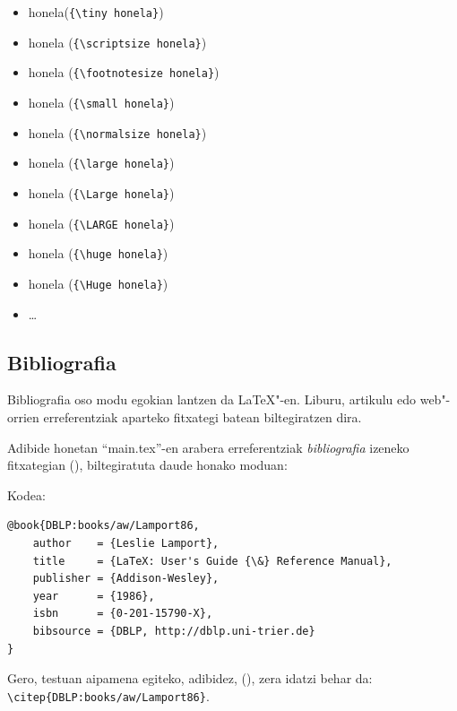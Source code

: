 \begin{itemize}
 \item {\tiny honela}(\verb+{\tiny honela}+)
 \item {\scriptsize honela} (\verb+{\scriptsize honela}+)
 \item {\footnotesize honela} (\verb+{\footnotesize honela}+)
 \item {\small honela} (\verb+{\small honela}+)
 \item {\normalsize honela} (\verb+{\normalsize honela}+)
 \item {\large honela} (\verb+{\large honela}+)
 \item {\Large honela} (\verb+{\Large honela}+)
 \item {\LARGE honela} (\verb+{\LARGE honela}+)
 \item {\huge honela} (\verb+{\huge honela}+)
 \item {\Huge honela} (\verb+{\Huge honela}+)
 \item \ldots 
\end{itemize}


\subsection{Bibliografia}
\label{azpiatala:biblio}

Bibliografia oso modu egokian lantzen da \LaTeX{}"-en. Liburu, artikulu edo web"-orrien erreferentziak aparteko fitxategi batean biltegiratzen dira.

Adibide honetan ``main.tex''-en arabera erreferentziak \emph{bibliografia} izeneko fitxategian (\verb++), biltegiratuta daude honako moduan:
 
\vspace{0.25 cm}

Kodea:
\vspace{0.25 cm}

\begin{minipage}{8cm}
\begin{verbatim}
@book{DBLP:books/aw/Lamport86,
	author    = {Leslie Lamport},
	title     = {LaTeX: User's Guide {\&} Reference Manual},
	publisher = {Addison-Wesley},
	year      = {1986},
	isbn      = {0-201-15790-X},
	bibsource = {DBLP, http://dblp.uni-trier.de}
}
\end{verbatim}
\end{minipage}

\vspace{0.25 cm}

Gero, testuan aipamena egiteko, adibidez, (\cite{DBLP:books/aw/Lamport86}), zera idatzi behar da: \verb+\citep{DBLP:books/aw/Lamport86}+.

